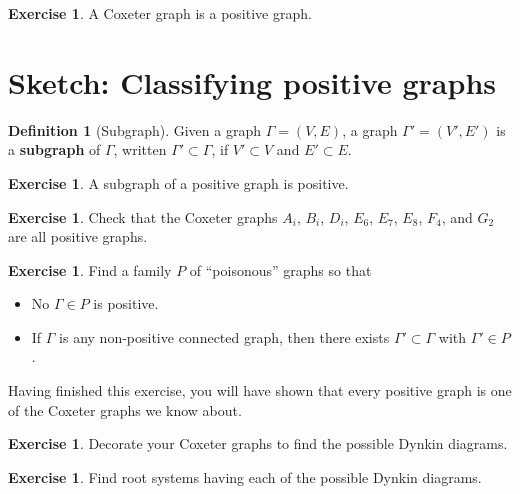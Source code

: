 \documentclass[12pt]{article}
\theoremstyle{remark}
\theoremstyle{definition}
\newtheorem{defn}[thm]{Definition}
\newtheorem{exercise}[thm]{Exercise}
\newcommand{\defnword}[1]{\textbf{#1}}
\begin{document}
\begin{exercise}
A Coxeter graph is a positive graph.
\end{exercise}

\section{Sketch: Classifying positive graphs}

\begin{defn}[Subgraph]
Given a graph $\Gamma = (V,E)$, a graph $\Gamma' = (V',E')$ is a
\defnword{subgraph} of $\Gamma$, written $\Gamma' \subset \Gamma$, if
$V' \subset V$ and $E' \subset E$.
\end{defn}

\begin{exercise}
A subgraph of a positive graph is positive.
\end{exercise}

\begin{exercise}
Check that the Coxeter graphs $A_i$, $B_i$, $D_i$, $E_6$, $E_7$,
$E_8$, $F_4$, and $G_2$ are all positive graphs.
\end{exercise}

\begin{exercise}
Find a family $P$ of ``poisonous'' graphs so that
\begin{itemize}
\item No $\Gamma \in P$ is positive.
\item If $\Gamma$ is any non-positive connected graph, then there
exists $\Gamma' \subset \Gamma$ with $\Gamma' \in P$.
\end{itemize}
\end{exercise}

Having finished this exercise, you will have shown that every positive
graph is one of the Coxeter graphs we know about.

\begin{exercise}
Decorate your Coxeter graphs to find the possible Dynkin diagrams.
\end{exercise}

\begin{exercise}
Find root systems having each of the possible Dynkin diagrams.
\end{exercise}
\end{document}
